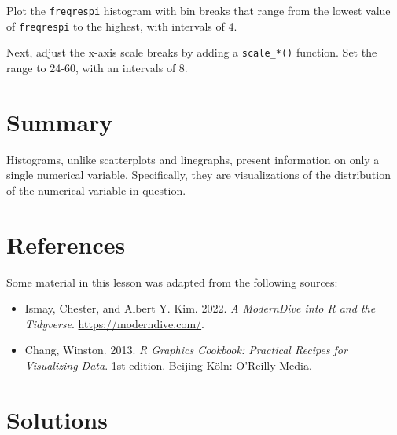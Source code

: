 \documentclass[
  letterpaper,
  DIV=11,
  numbers=noendperiod]{scrreprt}
\providecommand{\tightlist}{%
  \setlength{\itemsep}{0pt}\setlength{\parskip}{0pt}}\usepackage{longtable,booktabs,array}
\begin{document}
\begin{tcolorbox}[enhanced jigsaw, title=\textcolor{quarto-callout-tip-color}{\faLightbulb}\hspace{0.5em}{Practice}, colbacktitle=quarto-callout-tip-color!10!white, leftrule=.75mm, arc=.35mm, opacityback=0, bottomrule=.15mm, rightrule=.15mm, toptitle=1mm, breakable, toprule=.15mm, colback=white, coltitle=black, colframe=quarto-callout-tip-color-frame, bottomtitle=1mm, titlerule=0mm, left=2mm, opacitybacktitle=0.6]

Plot the \texttt{freqrespi} histogram with bin breaks that range from
the lowest value of \texttt{freqrespi} to the highest, with intervals of
4.

Next, adjust the x-axis scale breaks by adding a \texttt{scale\_*()}
function. Set the range to 24-60, with an intervals of 8.

\end{tcolorbox}

\section{Summary}\label{summary-1}

Histograms, unlike scatterplots and linegraphs, present information on
only a single numerical variable. Specifically, they are visualizations
of the distribution of the numerical variable in question.

\section*{References}\label{references-15}


Some material in this lesson was adapted from the following sources:

\begin{itemize}
\tightlist
\item
  Ismay, Chester, and Albert Y. Kim. 2022. \emph{A ModernDive into R and
  the Tidyverse}. \url{https://moderndive.com/}.
\item
  Chang, Winston. 2013. \emph{R Graphics Cookbook: Practical Recipes for
  Visualizing Data}. 1st edition. Beijing Köln: O'Reilly Media.
\end{itemize}

\section{Solutions}\label{solutions-12}
\end{document}
